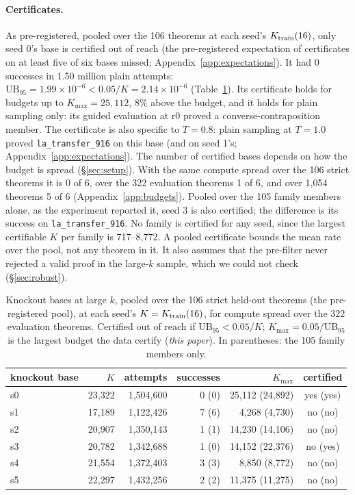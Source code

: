 \paragraph{Certificates.} As pre-registered, pooled over the 106 theorems at each seed's $K_{\mathrm{train}}(16)$, only seed 0's
base is certified out of reach (the pre-registered expectation of certificates on at least five of six bases
missed; Appendix~\ref{app:expectations}). It had 0 successes in 1.50 million plain attempts: $\mathrm{UB}_{95} = 1.99\times10^{-6}
< 0.05/K = 2.14\times10^{-6}$ (Table~\ref{tab:certs}). Its certificate holds for budgets up to $K_{\max} = 25{,}112$, 8\%
above the budget, and it holds for plain sampling only: its guided evaluation at r0 proved a converse-contraposition
member. The certificate is also specific to $T=0.8$: plain sampling at $T=1.0$ proved \texttt{la\_transfer\_916} on
this base (and on seed 1's; Appendix~\ref{app:expectations}). The number of certified bases depends on how the budget is spread (\S\ref{sec:setup}). With the same compute
spread over the 106 strict theorems it is 0 of 6, over the 322 evaluation theorems 1 of 6, and over 1,054 theorems 5 of 6
(Appendix~\ref{app:budgets}). Pooled over the 105 family members alone, as the experiment reported it, seed 3 is also
certified; the difference is its success on \texttt{la\_transfer\_916}. No family is certified for any seed, since the
largest certifiable $K$ per family is 717--8,772. A pooled certificate bounds the mean rate over the pool, not any
theorem in it. It also assumes that the pre-filter never rejected a valid proof in the large-$k$ sample, which we could
not check (\S\ref{sec:robust}).

\begin{table}[t]
\centering\small
\caption{Knockout bases at large $k$, pooled over the 106 strict held-out theorems (the pre-registered pool), at each
seed's $K = K_{\mathrm{train}}(16)$, for compute spread over the 322 evaluation theorems. Certified out of reach if
$\mathrm{UB}_{95} < 0.05/K$; $K_{\max} = 0.05/\mathrm{UB}_{95}$ is the largest budget the data certify (\emph{this
paper}). In parentheses: the 105 family members only.}
\label{tab:certs}
\begin{tabular}{lrrrrc}
\toprule
knockout base & $K$ & attempts & successes & $K_{\max}$ & certified \\
\midrule
s0 & 23,322 & 1,504,600 & 0 (0) & 25,112 (24,892) & yes (yes) \\
s1 & 17,189 & 1,122,426 & 7 (6) & 4,268 (4,730) & no (no) \\
s2 & 20,907 & 1,350,143 & 1 (1) & 14,230 (14,106) & no (no) \\
s3 & 20,782 & 1,342,688 & 1 (0) & 14,152 (22,376) & no (yes) \\
s4 & 21,554 & 1,372,403 & 3 (3) & 8,850 (8,772) & no (no) \\
s5 & 22,297 & 1,432,256 & 2 (2) & 11,375 (11,275) & no (no) \\
\bottomrule
\end{tabular}
\end{table}

